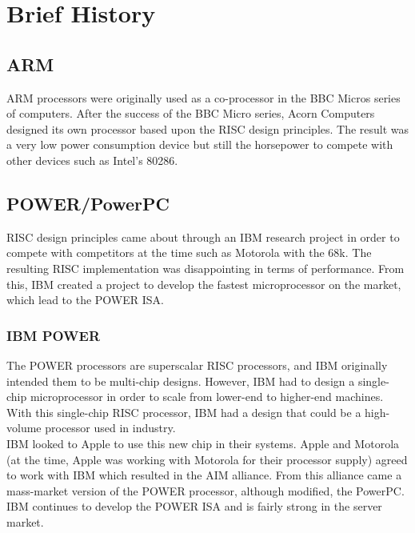 \documentclass[letterpaper,10pt,titlepage]{article}
\begin{document}


\section{Brief  History}
\subsection{ARM}

ARM processors were originally used as a co-processor in the BBC Micros series of computers. After the success of the BBC Micro series, Acorn Computers designed its own processor based upon the RISC design principles\cite{Manners}. The result was a very low power consumption device but still the horsepower to compete with other devices such as Intel's 80286\cite{Chattopadhyay}.

\subsection{POWER/PowerPC}

RISC design principles came about through an IBM research project in order to compete with competitors at the time such as Motorola with the 68k. The resulting RISC implementation was disappointing in terms of performance. From this, IBM created a project to develop the fastest microprocessor on the market, which lead to the POWER ISA.

\subsubsection{IBM POWER}

The POWER processors are superscalar RISC processors, and IBM originally intended them to be multi-chip designs. However, IBM had to design a single-chip microprocessor in order to scale from lower-end to higher-end machines. With this single-chip RISC processor, IBM had a design that could be a high-volume processor used in industry.\\

IBM looked to Apple to use this new chip in their systems. Apple and Motorola (at the time, Apple was working with Motorola for their processor supply) agreed to work with IBM which resulted in the AIM alliance. From this alliance came a mass-market version of the POWER processor, although modified, the PowerPC\cite{Power.org}.\\

IBM continues to develop the POWER ISA and is fairly strong in the server market\cite{TechFiles}.
\end{document}
